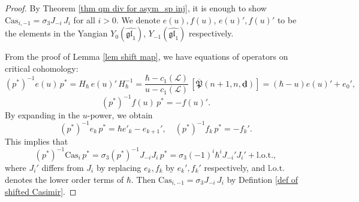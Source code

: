 \documentclass[10pt]{amsart}
\theoremstyle{definition}
\numberwithin{equation}{section}
\newcommand{\bd}{\mathbf{d}}
\newcommand{\vir}{\mathrm{vir}}
\newcommand{\sT}{\mathsf{T}}
\newcommand{\ev}{\operatorname{ev}}
\begin{document}
\begin{proof}
By Theorem \ref{thm qm div for asym_sp inj}, it is enough to show $\mathrm{Cas}_{i,-1}=\sigma_3 J_{-i}\, J_{i}$ for all $i>0$. We denote $e(u), f(u)$, $e(u)', f(u)'$ to be the elements in the Yangian $Y_{0}(\widehat{\mathfrak{gl}_1})$, $Y_{-1}(\widehat{\mathfrak{gl}_1})$ respectively. 

From the proof of Lemma \ref{lem shift map}, we have equations of operators on critical cohomology: 
$$(p^{*})^{-1}e(u)\,p^{*}=H_{\hbar}\,e(u)'\,H_{\hbar}^{-1}=\frac{\hbar-c_1(\mathcal L)}{u-c_1(\mathcal L)}\,[\overline{\mathfrak{P}}(n+1,n,\underline{\bd})]
=(\hbar-u)e(u)'+e_0', $$
$$(p^{*})^{-1}f(u)\,p^{*}=-f(u)'.$$
By expanding in the $u$-power, we obtain 
$$(p^{*})^{-1}e_k\,p^{*}=\hbar e'_k-e_{k+1}', \quad (p^{*})^{-1}f_k\,p^{*}=-f_k'. $$ 
This implies that 
\begin{equation}\label{equ on jnn}
(p^{*})^{-1}\mathrm{Cas}_i\,p^{*}=\sigma_3(p^{*})^{-1}J_{-i}J_i\,p^{*}=\sigma_3(-1)^i\hbar^i J_{-i}'J_i'+\mathrm{l.o.t.},
\end{equation}
where $J_i'$ differs from $J_i$ by replacing $e_k, f_k$ by $e_k', f_k'$ respectively, and $\mathrm{l.o.t.}$ denotes the lower order terms of $\hbar$. Then $\mathrm{Cas}_{i,-1}=\sigma_3J_{-i}\, J_{i}$ by Defintion \ref{def of shifted Casimir}.

\end{proof}
\end{document}
